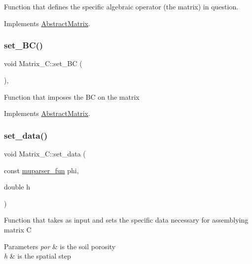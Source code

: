 Function that defines the specific algebraic operator (the matrix) in question. 

Implements \hyperlink{classAbstractMatrix_a40016da151226fbfcd444839943d8fe3}{Abstract\+Matrix}.

\mbox{\label{classMatrix__C_a9235c2dbf2853fae4122251726a7efce}} 
\subsubsection{\texorpdfstring{set\+\_\+\+B\+C()}{set\_BC()}}
{\footnotesize\ttfamily void Matrix\+\_\+\+C\+::set\+\_\+\+BC (\begin{DoxyParamCaption}{ }\end{DoxyParamCaption})\hspace{0.3cm}{\ttfamily [override]}, {\ttfamily [virtual]}}

Function that imposes the BC on the matrix 

Implements \hyperlink{classAbstractMatrix_aa0a17dacbeede4180531b115d4a9f3eb}{Abstract\+Matrix}.

\mbox{\label{classMatrix__C_ae05f7fd6edf4816b2703123845422e37}} 
\subsubsection{\texorpdfstring{set\+\_\+data()}{set\_data()}}
{\footnotesize\ttfamily void Matrix\+\_\+\+C\+::set\+\_\+data (\begin{DoxyParamCaption}\item[{const \hyperlink{classmuparser__fun}{muparser\+\_\+fun}}]{phi,  }\item[{double}]{h }\end{DoxyParamCaption})}

Function that takes as input and sets the specific data necessary for assemblying matrix C 
\begin{DoxyParams}{Parameters}
{\em por} & is the soil porosity \\
\hline
{\em h} & is the spatial step \\
\hline
\end{DoxyParams}
\mbox{\label{classMatrix__C_af305bfe533e702d629df3fb0409bc8d2}} 
